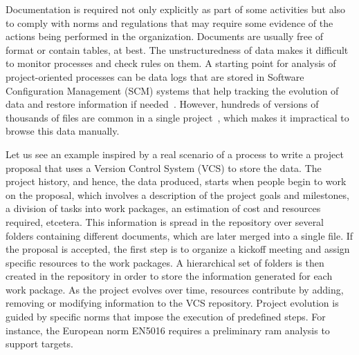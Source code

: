 Documentation is required not only explicitly as part of some activities but also to comply with norms and regulations that may require some evidence of the actions being performed in the organization. Documents are usually free of format or contain tables, at best. The unstructuredness of data makes it difficult to monitor processes and check rules on them. A starting point for analysis of project-oriented processes can be data logs %
that are stored in Software Configuration Management (SCM) systems that help tracking the evolution of data and restore information if needed~\cite{voinea_open_2006}.
However, hundreds of versions of thousands of files are common in a single project~\cite{voinea_multiscale_2006}, which makes it impractical to browse this data manually.


Let us see an example inspired by a real scenario of a process to write a project proposal that uses a Version Control System (VCS) to store the data. The project history, and hence, the data produced, starts when people begin to work on the proposal, which involves a description of the project goals and milestones, a division of tasks into work packages, an estimation of cost and resources required, etcetera. This information is spread in the repository over several folders containing different documents, which are later merged into a single file. If the proposal is accepted, the first step is to organize a kickoff meeting and assign specific resources to the work packages. A hierarchical set of folders is then created in the repository in order to store the information generated for each work package. As the project evolves over time, resources contribute by adding, removing or modifying information to the VCS repository. %
Project evolution is guided by specific norms that impose the execution of predefined steps. For instance, the European norm EN5016 requires a preliminary \gls{ram} analysis to support targets. 

